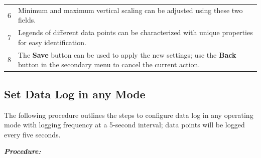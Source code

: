 \begin{longtable}[]{@{}ll@{}}
\begin{minipage}[t]{0.07\columnwidth}
6\strut
\end{minipage} & \begin{minipage}[t]{0.88\columnwidth}\raggedright
Minimum and maximum vertical scaling can be adjusted using these two
fields.\strut
\end{minipage}\tabularnewline
\begin{minipage}[t]{0.07\columnwidth}\raggedright
7\strut
\end{minipage} & \begin{minipage}[t]{0.88\columnwidth}\raggedright
Legends of different data points can be characterized with unique
properties for easy identification.\strut
\end{minipage}\tabularnewline
\begin{minipage}[t]{0.07\columnwidth}\raggedright
8\strut
\end{minipage} & \begin{minipage}[t]{0.88\columnwidth}\raggedright
The \textbf{Save} button can be used to apply the new settings; use the
\textbf{Back} button in the secondary menu to cancel the current
action.\strut
\end{minipage}\tabularnewline
\bottomrule
\end{longtable}


\subsection{Set Data Log in any
Mode}

The following procedure outlines the steps to configure data log in any
operating mode with logging frequency at a 5-second interval; data
points will be logged every five seconds.

\textbf{\emph{Procedure:}}

